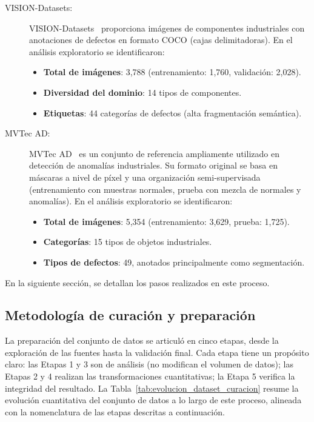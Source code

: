\begin{description}
    \item[VISION-Datasets:]  VISION-Datasets~\cite{bai2023visiondatasets} proporciona imágenes de componentes industriales con anotaciones de defectos en formato COCO (cajas delimitadoras). En el análisis exploratorio se identificaron:
\begin{itemize}
    \item \textbf{Total de imágenes}: 3{,}788 (entrenamiento: 1{,}760, validación: 2{,}028).
    \item \textbf{Diversidad del dominio}: 14 tipos de componentes.
    \item \textbf{Etiquetas}: 44 categorías de defectos (alta fragmentación semántica).
\end{itemize}
    \item[MVTec AD:] MVTec AD~\cite{bergmann2019mvtec} es un conjunto de referencia ampliamente utilizado en detección de anomalías industriales. Su formato original se basa en máscaras a nivel de píxel y una organización semi-supervisada (entrenamiento con muestras normales, prueba con mezcla de normales y anomalías). En el análisis exploratorio se identificaron:
\begin{itemize}
    \item \textbf{Total de imágenes}: 5{,}354 (entrenamiento: 3{,}629, prueba: 1{,}725).
    \item \textbf{Categorías}: 15 tipos de objetos industriales.
    \item \textbf{Tipos de defectos}: 49, anotados principalmente como segmentación.
\end{itemize}
\end{description}

En la siguiente sección, se detallan los pasos realizados en este proceso.

\subsection{Metodología de curación y preparación}

La preparación del conjunto de datos se articuló en cinco etapas, desde la exploración de las fuentes hasta la validación final. Cada etapa tiene un propósito claro: las Etapas 1 y 3 son de análisis (no modifican el volumen de datos); las Etapas 2 y 4 realizan las transformaciones cuantitativas; la Etapa 5 verifica la integridad del resultado. La Tabla~\ref{tab:evolucion_dataset_curacion} resume la evolución cuantitativa del conjunto de datos a lo largo de este proceso, alineada con la nomenclatura de las etapas descritas a continuación.

